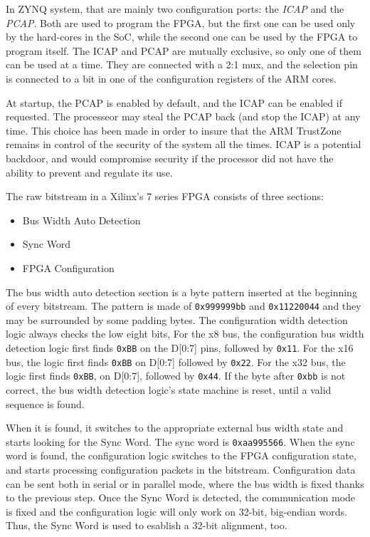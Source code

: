 In ZYNQ system, that are mainly two configuration ports: the \textit{ICAP} and the \textit{PCAP}. Both are used to program the FPGA, but the first one can be used only by the hard-cores in the SoC, while the second one can be used by the FPGA to program itself. The ICAP and PCAP are mutually exclusive, so only one of them can be used at a time. They are connected with a 2:1 mux, and the selection pin is connected to a bit in one of the configuration registers of the ARM cores. \bigskip

At startup, the PCAP is enabled by default, and the ICAP can be enabled if requested. The processeor may steal the PCAP back (and stop the ICAP) at any time. This choice has been made in order to insure that the ARM TrustZone remains in control of the security of the system all the times. ICAP is a potential backdoor, and would compromise security if the processor did not have the ability to prevent and regulate its use.\bigskip

The raw bitstream in a Xilinx's 7 series FPGA consists of three sections:
\begin{itemize}
    \item Bus Width Auto Detection
    \item Sync Word
    \item FPGA Configuration
\end{itemize}

The bus width auto detection section is a byte pattern inserted at the beginning of every bitstream. The pattern is made of \texttt{0x999999bb} and \texttt{0x11220044} and they may be surrounded by some padding bytes. The configuration width detection logic always checks the low eight bits, For the x8 bus, the configuration bus width detection logic first finds \texttt{0xBB} on the D[0:7] pins, followed by \texttt{0x11}. For the x16 bus, the logic first finds \texttt{0xBB} on D[0:7] followed by \texttt{0x22}. For the x32 bus, the logic first finds \texttt{0xBB}, on D[0:7], followed by \texttt{0x44}. If the byte after \texttt{0xbb} is not correct, the bus width detection logic's state machine is reset, until a valid sequence is found. \bigskip

When it is found, it switches to the appropriate external bus width state and starts looking for the Sync Word. The sync word is \texttt{0xaa995566}. When the sync word is found, the configuration logic switches to the FPGA configuration state, and starts processing configuration packets in the bitstream. Configuration data can be sent both in serial or in parallel mode, where the bus width is fixed thanks to the previous step. Once the Sync Word is detected, the communication mode is fixed and the configuration logic will only work on 32-bit, big-endian words. Thus, the Sync Word is used to esablish a 32-bit alignment, too. \bigskip

